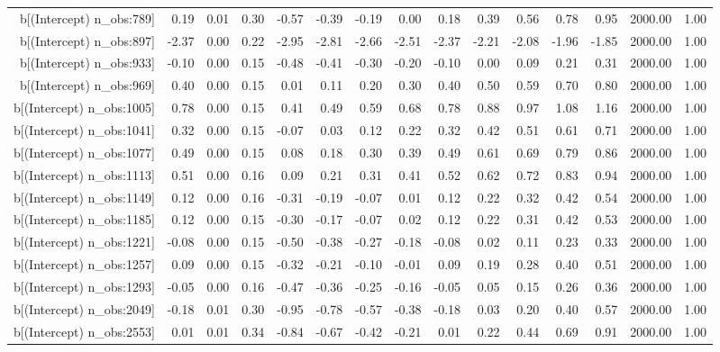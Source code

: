 \begin{table}[ht]
\begin{tabular}{rrrrrrrrrrrrrrr}
  b[(Intercept) n\_obs:789] & 0.19 & 0.01 & 0.30 & -0.57 & -0.39 & -0.19 & 0.00 & 0.18 & 0.39 & 0.56 & 0.78 & 0.95 & 2000.00 & 1.00 \\ 
  b[(Intercept) n\_obs:897] & -2.37 & 0.00 & 0.22 & -2.95 & -2.81 & -2.66 & -2.51 & -2.37 & -2.21 & -2.08 & -1.96 & -1.85 & 2000.00 & 1.00 \\ 
  b[(Intercept) n\_obs:933] & -0.10 & 0.00 & 0.15 & -0.48 & -0.41 & -0.30 & -0.20 & -0.10 & 0.00 & 0.09 & 0.21 & 0.31 & 2000.00 & 1.00 \\ 
  b[(Intercept) n\_obs:969] & 0.40 & 0.00 & 0.15 & 0.01 & 0.11 & 0.20 & 0.30 & 0.40 & 0.50 & 0.59 & 0.70 & 0.80 & 2000.00 & 1.00 \\ 
  b[(Intercept) n\_obs:1005] & 0.78 & 0.00 & 0.15 & 0.41 & 0.49 & 0.59 & 0.68 & 0.78 & 0.88 & 0.97 & 1.08 & 1.16 & 2000.00 & 1.00 \\ 
  b[(Intercept) n\_obs:1041] & 0.32 & 0.00 & 0.15 & -0.07 & 0.03 & 0.12 & 0.22 & 0.32 & 0.42 & 0.51 & 0.61 & 0.71 & 2000.00 & 1.00 \\ 
  b[(Intercept) n\_obs:1077] & 0.49 & 0.00 & 0.15 & 0.08 & 0.18 & 0.30 & 0.39 & 0.49 & 0.61 & 0.69 & 0.79 & 0.86 & 2000.00 & 1.00 \\ 
  b[(Intercept) n\_obs:1113] & 0.51 & 0.00 & 0.16 & 0.09 & 0.21 & 0.31 & 0.41 & 0.52 & 0.62 & 0.72 & 0.83 & 0.94 & 2000.00 & 1.00 \\ 
  b[(Intercept) n\_obs:1149] & 0.12 & 0.00 & 0.16 & -0.31 & -0.19 & -0.07 & 0.01 & 0.12 & 0.22 & 0.32 & 0.42 & 0.54 & 2000.00 & 1.00 \\ 
  b[(Intercept) n\_obs:1185] & 0.12 & 0.00 & 0.15 & -0.30 & -0.17 & -0.07 & 0.02 & 0.12 & 0.22 & 0.31 & 0.42 & 0.53 & 2000.00 & 1.00 \\ 
  b[(Intercept) n\_obs:1221] & -0.08 & 0.00 & 0.15 & -0.50 & -0.38 & -0.27 & -0.18 & -0.08 & 0.02 & 0.11 & 0.23 & 0.33 & 2000.00 & 1.00 \\ 
  b[(Intercept) n\_obs:1257] & 0.09 & 0.00 & 0.15 & -0.32 & -0.21 & -0.10 & -0.01 & 0.09 & 0.19 & 0.28 & 0.40 & 0.51 & 2000.00 & 1.00 \\ 
  b[(Intercept) n\_obs:1293] & -0.05 & 0.00 & 0.16 & -0.47 & -0.36 & -0.25 & -0.16 & -0.05 & 0.05 & 0.15 & 0.26 & 0.36 & 2000.00 & 1.00 \\ 
  b[(Intercept) n\_obs:2049] & -0.18 & 0.01 & 0.30 & -0.95 & -0.78 & -0.57 & -0.38 & -0.18 & 0.03 & 0.20 & 0.40 & 0.57 & 2000.00 & 1.00 \\ 
  b[(Intercept) n\_obs:2553] & 0.01 & 0.01 & 0.34 & -0.84 & -0.67 & -0.42 & -0.21 & 0.01 & 0.22 & 0.44 & 0.69 & 0.91 & 2000.00 & 1.00 \\ 

\end{tabular}
\end{table}
